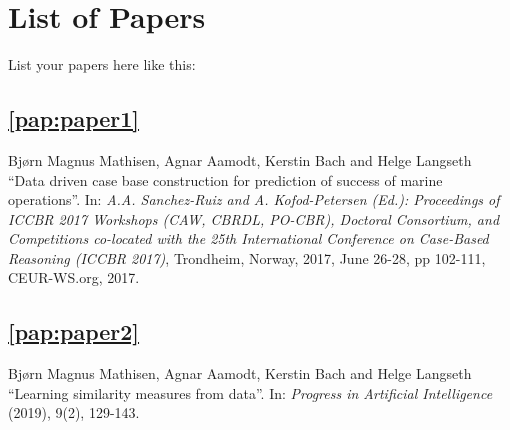 \chapter{List of Papers}

List your papers here like this:

\section*{\cref{pap:paper1}}
Bjørn Magnus Mathisen, Agnar Aamodt, Kerstin Bach and Helge Langseth
\enquote{Data driven case base construction for prediction of success of marine
  operations}. In: \emph{A.A. Sanchez-Ruiz and A. Kofod-Petersen (Ed.):
  Proceedings of ICCBR 2017 Workshops (CAW, CBRDL, PO-CBR), Doctoral Consortium,
  and Competitions co-located with the 25th International Conference on
  Case-Based Reasoning (ICCBR 2017)}, Trondheim, Norway, 2017, June 26-28, pp
102-111, CEUR-WS.org, 2017.

\section*{\cref{pap:paper2}}
Bjørn Magnus Mathisen, Agnar Aamodt, Kerstin Bach and Helge Langseth
\enquote{Learning similarity measures from data}.
In: \emph{Progress in Artificial Intelligence} (2019), 9(2), 129-143.

